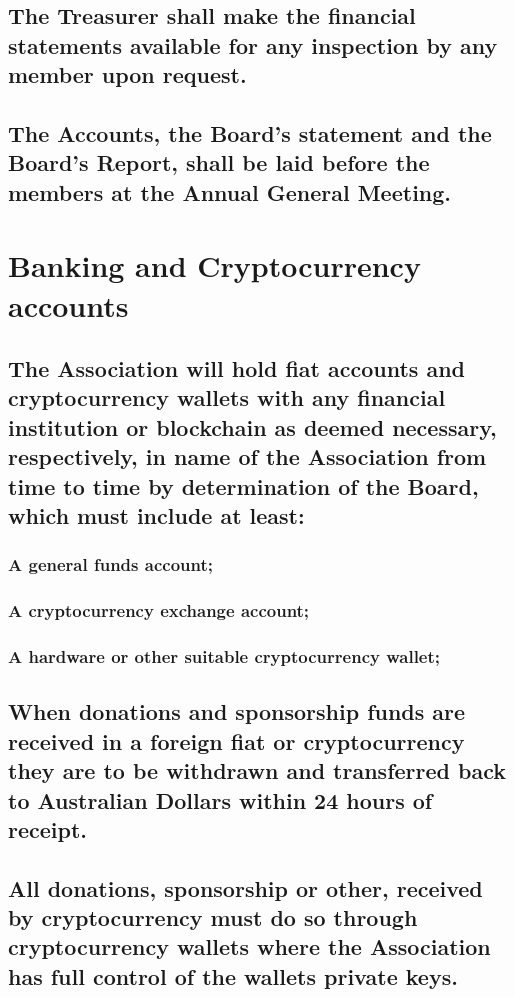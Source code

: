 \documentclass{article}
\newenvironment{subs}
  {\adjustwidth{2em}{0pt}}
  {\endadjustwidth}
\begin{document}
\begin{subs}
\begin{subs}
\begin{subs}
\subsection{The Treasurer shall make the financial statements available for any inspection by any member upon request.}
\subsection{The Accounts, the Board's statement and the Board's Report, shall be laid before the members at the Annual General Meeting.}
\end{subs}

\section{Banking and Cryptocurrency accounts}
\begin{subs}
\subsection{The Association will hold fiat accounts and cryptocurrency wallets with any financial institution or blockchain as deemed necessary, respectively, in name of the Association from time to time by determination of the Board, which must include at least:}
\begin{subs}
\subsubsection{A general funds account;}
\subsubsection{A cryptocurrency exchange account;}
\newpage

\subsubsection{A hardware or other suitable cryptocurrency wallet;}
\end{subs}
\subsection{When donations and sponsorship funds are received in a foreign fiat or cryptocurrency they are to be withdrawn and transferred back to Australian Dollars within 24 hours of receipt.}
\subsection{All donations, sponsorship or other, received by cryptocurrency must do so through cryptocurrency wallets where the Association has full control of the wallets private keys.}
\end{subs}


\end{subs}
\end{subs}
\end{document}
